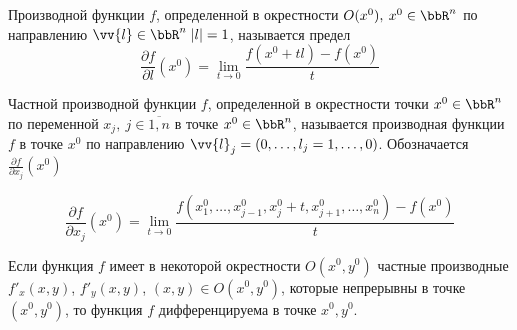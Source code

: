 \begin{defn}
Производной функции $f$, определенной в окрестности $O(x^0), \: x^0 \in \bbR^n$ по направлению $\vv{l} \in \bbR^n \; |l| = 1$, называется предел
$$
\frac{\partial f}{\partial l}(x^0) = \lim\limits_{t \to 0} \frac{f(x^0 + tl) - f(x^0)}{t}
$$
\end{defn}

\begin{defn}
Частной производной функции $f$, определенной в окрестности точки $x^0 \in \bbR^n$ по переменной $x_j, \: j \in \overline{1,n}$ в точке $x^0 \in \bbR^n$, называется производная функции $f$ в точке $x^0$ по направлению $\vv{l}_j = (0, \ldots, l_j = 1, \ldots, 0)$. Обозначается $\frac{\partial f}{\partial x_j}(x^0)$

$$
\frac{\partial f}{\partial x_j}(x^0) = \lim\limits_{t \to 0} \frac{f(x^0_1, \ldots, x^0_{j - 1}, x^0_j + t, x^0_{j + 1}, \ldots, x^0_n) - f(x^0)}{t}  
$$
\end{defn}


\begin{thm} \label{ch8th1}
Если функция $f$ имеет в некоторой окрестности $O(x^0, y^0)$ частные производные $f'_x(x,y)$, $f'_y(x,y)$, $(x,y) \in O(x^0, y^0)$, которые непрерывны в точке $(x^0, y^0)$, то функция $f$ дифференцируема в точке $x^0, y^0$.
\end{thm}


